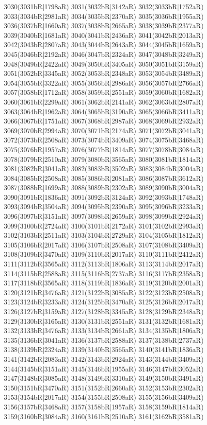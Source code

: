 3030(3031bR|1798aR) 3031(3032bR|3142aR) 3032(3033bR|1752aR) \\3033(3034bR|2981aR) 3034(3035bR|2370aR) 3035(3036bR|1955aR) 3036(3037bR|1660aR) 3037(3038bR|2665aR) 3038(3039bR|2377aR) 3039(3040bR|1681aR) 3040(3041bR|2436aR) 3041(3042bR|2013aR) \\3042(3043bR|2807aR) 3043(3044bR|2643aR) 3044(3045bR|1659aR) 3045(3046bR|2192aR) 3046(3047bR|2324aR) 3047(3048bR|3249aR) 3048(3049bR|2422aR) 3049(3050bR|3405aR) 3050(3051bR|3159aR) \\3051(3052bR|3345aR) 3052(3053bR|2348aR) 3053(3054bR|3489aR) 3054(3055bR|3322aR) 3055(3056bR|2986aR) 3056(3057bR|2766aR) 3057(3058bR|1712aR) 3058(3059bR|2551aR) 3059(3060bR|1682aR) \\3060(3061bR|2299aR) 3061(3062bR|2141aR) 3062(3063bR|2807aR) 3063(3064bR|1962aR) 3064(3065bR|3190aR) 3065(3066bR|3411aR) 3066(3067bR|1751aR) 3067(3068bR|2987aR) 3068(3069bR|2932aR) \\3069(3070bR|2994aR) 3070(3071bR|2174aR) 3071(3072bR|3041aR) 3072(3073bR|2508aR) 3073(3074bR|3409aR) 3074(3075bR|3468aR) 3075(3076bR|1957aR) 3076(3077bR|1814aR) 3077(3078bR|3084aR) \\3078(3079bR|2510aR) 3079(3080bR|3565aR) 3080(3081bR|1814aR) 3081(3082bR|3041aR) 3082(3083bR|3502aR) 3083(3084bR|3004aR) 3084(3085bR|2508aR) 3085(3086bR|2081aR) 3086(3087bR|3612aR) \\3087(3088bR|1699aR) 3088(3089bR|2302aR) 3089(3090bR|3004aR) 3090(3091bR|1836aR) 3091(3092bR|3124aR) 3092(3093bR|1748aR) 3093(3094bR|3504aR) 3094(3095bR|2390aR) 3095(3096bR|3233aR) \\3096(3097bR|3151aR) 3097(3098bR|2659aR) 3098(3099bR|2924aR) 3099(3100bR|2724aR) 3100(3101bR|2172aR) 3101(3102bR|2993aR) 3102(3103bR|2511aR) 3103(3104bR|2729aR) 3104(3105bR|1812aR) \\3105(3106bR|2017aR) 3106(3107bR|2508aR) 3107(3108bR|3409aR) 3108(3109bR|3470aR) 3109(3110bR|2017aR) 3110(3111bR|2412aR) 3111(3112bR|3565aR) 3112(3113bR|1806aR) 3113(3114bR|2017aR) \\3114(3115bR|2588aR) 3115(3116bR|2737aR) 3116(3117bR|2358aR) 3117(3118bR|3565aR) 3118(3119bR|1836aR) 3119(3120bR|2001aR) 3120(3121bR|3476aR) 3121(3122bR|3085aR) 3122(3123bR|2508aR) \\3123(3124bR|3233aR) 3124(3125bR|3470aR) 3125(3126bR|2017aR) 3126(3127bR|3159aR) 3127(3128bR|3345aR) 3128(3129bR|2348aR) 3129(3130bR|3165aR) 3130(3131bR|2551aR) 3131(3132bR|1681aR) \\3132(3133bR|3476aR) 3133(3134bR|2661aR) 3134(3135bR|1806aR) 3135(3136bR|3041aR) 3136(3137bR|2588aR) 3137(3138bR|2737aR) 3138(3139bR|2324aR) 3139(3140bR|3565aR) 3140(3141bR|1836aR) \\3141(3142bR|2083aR) 3142(3143bR|2924aR) 3143(3144bR|3409aR) 3144(3145bR|3151aR) 3145(3146bR|1955aR) 3146(3147bR|3052aR) 3147(3148bR|3085aR) 3148(3149bR|3310aR) 3149(3150bR|3491aR) \\3150(3151bR|3470aR) 3151(3152bR|2660aR) 3152(3153bR|2302aR) 3153(3154bR|2017aR) 3154(3155bR|2508aR) 3155(3156bR|3409aR) 3156(3157bR|3468aR) 3157(3158bR|1957aR) 3158(3159bR|1814aR) \\3159(3160bR|3084aR) 3160(3161bR|2510aR) 3161(3162bR|3581aR) 